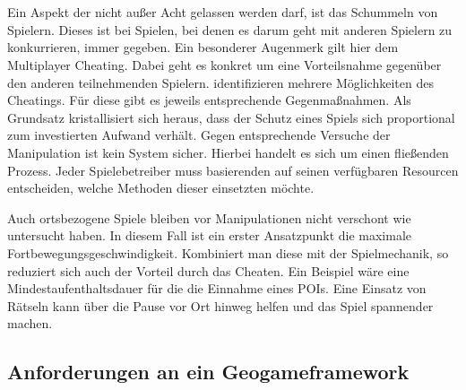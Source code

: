 \\\\
Ein Aspekt der nicht außer Acht gelassen werden darf, ist das Schummeln von Spielern. Dieses ist bei Spielen, bei denen es darum geht mit anderen Spielern zu konkurrieren, immer  gegeben.\cite{Consalvo.2005} Ein besonderer Augenmerk gilt hier dem Multiplayer Cheating. Dabei geht es konkret um eine Vorteilsnahme gegenüber den anderen teilnehmenden Spielern.
\textcite{Yan.2005} identifizieren mehrere Möglichkeiten des Cheatings. Für diese gibt es jeweils entsprechende Gegenmaßnahmen. Als Grundsatz kristallisiert sich heraus, dass der Schutz eines Spiels sich proportional zum investierten Aufwand verhält. Gegen entsprechende Versuche der Manipulation ist kein System sicher. Hierbei handelt es sich um einen fließenden Prozess.
Jeder Spielebetreiber muss basierenden auf seinen verfügbaren Resourcen entscheiden, welche Methoden dieser einsetzten möchte. 

Auch ortsbezogene Spiele bleiben vor Manipulationen nicht verschont wie \textcite{He.2011} untersucht haben.
In diesem Fall ist ein erster Ansatzpunkt die maximale Fortbewegungsgeschwindigkeit. Kombiniert man diese mit der Spielmechanik, so reduziert sich auch der \glqq Vorteil\grqq{} durch das Cheaten. Ein Beispiel wäre eine Mindestaufenthaltsdauer für die die Einnahme eines POIs.
Eine Einsatz von Rätseln kann über die Pause vor Ort hinweg helfen und das Spiel spannender machen.

%
\subsection*{Anforderungen an ein Geogameframework}

